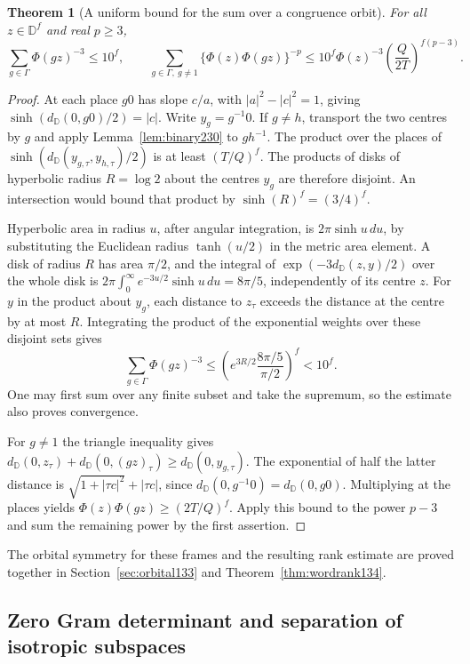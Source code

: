 \documentclass[a4paper,11pt]{article}
\newtheorem{theorem}[proposition]{Theorem}
\theoremstyle{definition}
\theoremstyle{remark}
\numberwithin{equation}{section}
\begin{document}
\begin{theorem}[A uniform bound for the sum over a congruence orbit]
\label{thm:disk230}
For all \(z\in\mathbb D^f\) and real \(p\ge3\),
\[
 \sum_{g\in\Gamma}\Phi(gz)^{-3}\le 10^f,\qquad
 \sum_{g\in\Gamma,\ g\ne1}\{\Phi(z)\Phi(gz)\}^{-p}
     \le 10^f\Phi(z)^{-3}
                      \left(\frac{Q}{2T}\right)^{f(p-3)}.
\]
\end{theorem}
\begin{proof}
At each place \(g0\) has slope \(c/a\), with
\(|a|^2-|c|^2=1\), giving
\(\sinh(d_{\mathbb D}(0,g0)/2)=|c|\).
Write \(y_g=g^{-1}0\). If \(g\ne h\), transport the two
centres by \(g\) and apply Lemma~\ref{lem:binary230} to
\(gh^{-1}\). The product over the places of
\(\sinh(d_{\mathbb D}(y_{g,\tau},y_{h,\tau})/2)\) is at
least \((T/Q)^f\). The products of disks of hyperbolic
radius \(R=\log 2\) about the centres \(y_g\) are therefore
disjoint. An intersection would bound that product by
\(\sinh(R)^f=(3/4)^f\).

Hyperbolic area in radius \(u\), after angular integration,
is \(2\pi\sinh u\,du\), by substituting the Euclidean
radius \(\tanh(u/2)\) in the metric area element.
A disk of radius \(R\) has area \(\pi/2\), and the integral
of \(\exp(-3d_{\mathbb D}(z,y)/2)\) over the whole disk
is \(2\pi\int_0^\infty e^{-3u/2}\sinh u\,du=8\pi/5\),
independently of its centre \(z\).
For \(y\) in the product about \(y_g\), each distance to
\(z_\tau\) exceeds the distance at the centre by at most
\(R\). Integrating the product of the exponential weights
over these disjoint sets gives
\[
 \sum_{g\in\Gamma}\Phi(gz)^{-3}
 \le\left(e^{3R/2}\frac{8\pi/5}{\pi/2}\right)^f<10^f.
\]
One may first sum over any finite subset and take the
supremum, so the estimate also proves convergence.

For \(g\ne1\) the triangle inequality gives
\(d_{\mathbb D}(0,z_\tau)+d_{\mathbb D}(0,(gz)_\tau)
 \ge d_{\mathbb D}(0,y_{g,\tau})\). The exponential of
half the latter distance is
\(\sqrt{1+|\tau c|^2}+|\tau c|\), since
\(d_{\mathbb D}(0,g^{-1}0)=d_{\mathbb D}(0,g0)\).
Multiplying at the places yields
\(\Phi(z)\Phi(gz)\ge(2T/Q)^f\).
Apply this bound to the power \(p-3\) and sum the remaining
power by the first assertion.
\end{proof}

The orbital symmetry for these frames and the resulting rank estimate are proved together in Section~\ref{sec:orbital133} and Theorem~\ref{thm:wordrank134}.

\subsection{Zero Gram determinant and separation of isotropic subspaces}\label{nav:VII-03}
\label{sec:success135}
\end{document}
